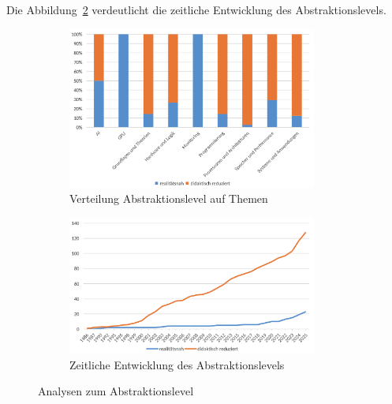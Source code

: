 Die Abbildung~\ref{fig:8-abstraktion-jahr} verdeutlicht die zeitliche Entwicklung des Abstraktionslevels.

\begin{figure}[!htbp]
    \centering
    \begin{subfigure}[b]{0.48\textwidth}
        \centering
        \includegraphics[width=0.90\textwidth]{graphics_lit/7-abtraktion-themen.png}
        \caption{Verteilung Abstraktionslevel auf Themen}
        \label{fig:7-abstraktion-themen}
    \end{subfigure}
    \hfill
    \begin{subfigure}[b]{0.48\textwidth}
        \centering
        \includegraphics[width=0.90\textwidth]{graphics_lit/8-abstraktion-jahr.png}
        \caption{Zeitliche Entwicklung des Abstraktionslevels}
        \label{fig:8-abstraktion-jahr}
    \end{subfigure}
    \caption{Analysen zum Abstraktionslevel}
    \label{fig:abstaktion-analysen}
\end{figure}

